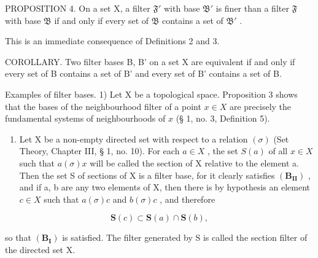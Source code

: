 PROPOSITION 4. On a set X, a filter \(\mathfrak{F}'\) with base \(\mathfrak{B}'\) is finer than a filter \(\mathfrak{F}\) with base \(\mathfrak{B}\) if and only if every set of \(\mathfrak{B}\) contains a set of \(\mathfrak{B}'\) .

This is an immediate consequence of Definitions 2 and 3.

COROLLARY. Two filter bases B, B' on a set X are equivalent if and only if every set of B contains a set of B' and every set of B' contains a set of B.

Examples of filter bases. 1) Let X be a topological space. Proposition 3 shows that the bases of the neighbourhood filter of a point \(x \in X\) are precisely the fundamental systems of neighbourhoods of \(x\) (§ 1, no. 3, Definition 5).

\begin{enumerate}
\def\labelenumi{\arabic{enumi})}
\setcounter{enumi}{1}
\tightlist
\item
  Let X be a non-empty directed set with respect to a relation \((\sigma)\) (Set Theory, Chapter III, § 1, no. 10). For each \(a \in X\) , the set \(S(a)\) of all \(x \in X\) such that \(a(\sigma)x\) will be called the section of X relative to the element a. Then the set S of sections of X is a filter base, for it clearly satisfies \((\mathbf{B}_{\mathbf{II}})\) , and if a, b are any two elements of X, then there is by hypothesis an element \(c \in X\) such that \(a(\sigma)c\) and \(b(\sigma)c\) , and therefore
\end{enumerate}

\[
\mathbf {S} (c) \subset \mathbf {S} (a) \cap \mathbf {S} (b),
\]

so that \((\mathbf{B}_{\mathbf{I}})\) is satisfied. The filter generated by S is called the section filter of the directed set X.

